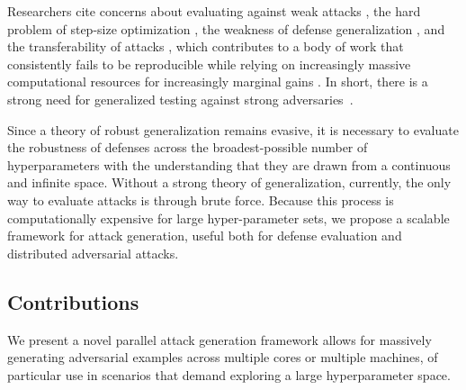 \documentclass[fonts]{icst}
\begin{document}
Researchers cite concerns about evaluating against weak attacks \cite{uesato2018adversarial,carlini2019evaluating}, the hard problem of step-size optimization \cite{li2016general}, the weakness of defense generalization \cite{stutz2019confidence}, and the transferability of attacks \cite{demontis2019adversarial}, which contributes to a body of work that consistently fails to be reproducible \cite{croce2020reliable} while  relying on increasingly massive computational resources for increasingly marginal gains \cite{desislavov2021compute}. In short, there is a strong need for generalized testing against strong adversaries~\cite{carlini2019evaluating}.

Since a theory of robust generalization remains evasive, it is necessary to evaluate the robustness of defenses across the broadest-possible number of hyperparameters with the understanding that they are drawn from a continuous and infinite space. Without a strong theory of generalization, currently, the only way to evaluate attacks is through brute force. Because this process is computationally expensive for large hyper-parameter sets, we propose a scalable framework for attack generation, useful both for defense evaluation and distributed adversarial attacks. 


\subsection{Contributions}


We present a novel parallel attack generation framework allows for massively generating adversarial examples across multiple cores or multiple machines, of particular use in scenarios that demand exploring a large hyperparameter space.
\end{document}
